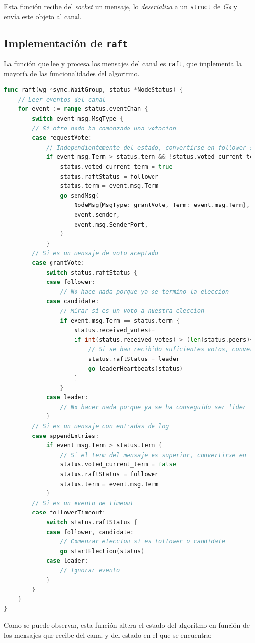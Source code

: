 Esta función recibe del \textit{socket} un mensaje, lo \textit{deserializa} a un \texttt{struct} de \textit{Go} \cite{gostructs} y envía este objeto al canal.

\subsection{Implementación de \texttt{raft}}

La función que lee y procesa los mensajes del canal es \texttt{raft}, que implementa la mayoría de las funcionalidades del algoritmo.

\begin{lstlisting}[language=go]
func raft(wg *sync.WaitGroup, status *NodeStatus) {
	// Leer eventos del canal
	for event := range status.eventChan {
		switch event.msg.MsgType {
		// Si otro nodo ha comenzado una votacion		
		case requestVote:
			// Independientemente del estado, convertirse en follower si el term del mensaje es superior y si no se ha votado en el term actual
			if event.msg.Term > status.term && !status.voted_current_term {
				status.voted_current_term = true
				status.raftStatus = follower
				status.term = event.msg.Term
				go sendMsg(
					NodeMsg{MsgType: grantVote, Term: event.msg.Term},
					event.sender,
					event.msg.SenderPort,
				)
			}
		// Si es un mensaje de voto aceptado
		case grantVote:
			switch status.raftStatus {
			case follower:
				// No hace nada porque ya se termino la eleccion
			case candidate:
				// Mirar si es un voto a nuestra eleccion
				if event.msg.Term == status.term {
					status.received_votes++
					if int(status.received_votes) > (len(status.peers)+1)/2 {
						// Si se han recibido suficientes votos, convertirse en lider
						status.raftStatus = leader
						go leaderHeartbeats(status)
					}
				}
			case leader:
				// No hacer nada porque ya se ha conseguido ser lider
			}
		// Si es un mensaje con entradas de log
		case appendEntries:
			if event.msg.Term > status.term {
				// Si el term del mensaje es superior, convertirse en follower
				status.voted_current_term = false
				status.raftStatus = follower
				status.term = event.msg.Term
			}
		// Si es un evento de timeout
		case followerTimeout:
			switch status.raftStatus {
			case follower, candidate:
				// Comenzar eleccion si es follower o candidate
				go startElection(status)
			case leader:
				// Ignorar evento
			}
		}
	}
}
\end{lstlisting}

Como se puede observar, esta función altera el estado del algoritmo en función de los mensajes que recibe del canal y del estado en el que se encuentra:

